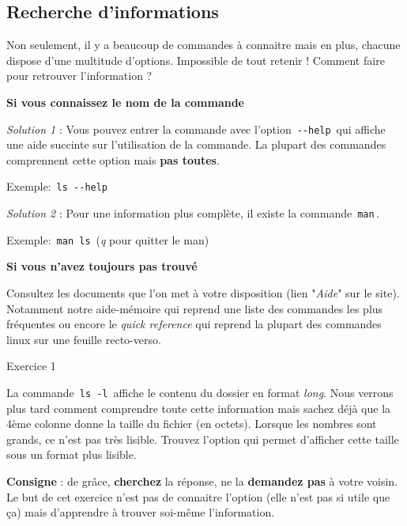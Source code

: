 \documentclass[a4paper,11pt]{article}
\begin{document}
\subsection{Recherche d'informations}  
Non seulement, il y a beaucoup de commandes \`a connaitre mais en plus, chacune dispose d'une multitude d'options. 
Impossible de tout retenir ! Comment faire pour retrouver l'information ?   

\par
\textbf{Si vous connaissez le nom de la commande}
\par
\textit{Solution 1} : Vous pouvez entrer la commande avec l'option \,\verb|--help|\,
qui affiche une aide succinte sur l'utilisation de la commande.
La  plupart des commandes comprennent cette option mais \textbf{pas toutes}.   

\par

Exemple: \,\verb|ls --help|\,
\par
\textit{Solution 2} : Pour une information plus compl\`ete, il existe la commande \,\verb|man|\,.  

\par

Exemple: \,\verb|man ls|\,  (\textit{q} pour quitter le man)  

\par
\textbf{Si vous n'avez toujours pas trouv\'e}
\par

Consultez les documents que l'on met \`a votre disposition 
(lien "\textit{Aide}" sur le site).
Notamment notre aide-m\'emoire qui reprend une liste des commandes les plus fr\'equentes 
ou encore le \textit{quick reference} 
qui reprend la plupart des commandes linux sur une feuille recto-verso.  

\par

\begin{Exercice}{Exercice 1}
	\textcolor{white}{.} \par
	
	\par
	
	La commande \,\verb|ls -l|\, 
	affiche le contenu du dossier en format \textit{long}.
	Nous verrons plus tard comment comprendre toute cette information 
	mais sachez d\'ej\`a que la 4\`eme colonne donne la taille du fichier (en octets).
	Lorsque les nombres sont grands, ce n'est pas tr\`es lisible. 
	Trouvez l'option qui permet d'afficher cette taille sous un format plus lisible.  
	
	\par
	\textbf{Consigne} : de gr\^ace, 
	\textbf{cherchez} la r\'eponse, 
	ne la \textbf{demandez pas} \`a votre voisin. 
	Le but de cet exercice n'est pas de connaitre l'option 
	(elle n'est pas si utile que \c ca) 
	mais d'apprendre \`a trouver soi-m\^eme l'information.  
	
	\par	
\end{Exercice}
\end{document}
